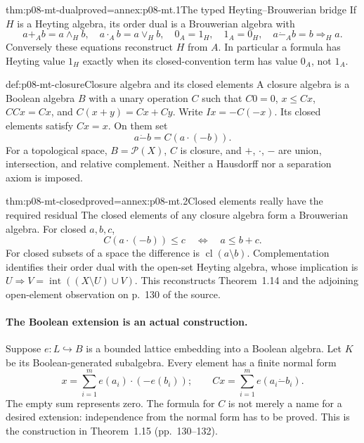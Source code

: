 \begin{hblemma}{thm:p08-mt-dual}{proved=annex:p08-mt.1}{The typed Heyting--Brouwerian bridge}
If \(H\) is a Heyting algebra, its order dual is a Brouwerian algebra with
\[
 a+_A b=a\wedge_H b,\quad a\cdot_A b=a\vee_H b,
 \quad0_A=1_H,\quad1_A=0_H,
 \quad a\mathbin{\dot{-}}_A b=b\Rightarrow_H a.
\]
Conversely these equations reconstruct \(H\) from \(A\).
In particular a formula has Heyting value \(1_H\) exactly when its
closed-convention term has value \(0_A\), not \(1_A\).
\end{hblemma}

\begin{hbdefinition}{def:p08-mt-closure}{Closure algebra and its closed elements}
A closure algebra is a Boolean algebra \(B\) with a unary operation \(C\)
such that \(C0=0\), \(x\leq Cx\), \(CCx=Cx\), and
\(C(x+y)=Cx+Cy\). Write \(Ix=-C(-x)\).
Its closed elements satisfy \(Cx=x\). On them set
\[
 a\mathbin{\dot{-}}b=C(a\cdot(-b)).
\]
For a topological space, \(B=\mathcal P(X)\), \(C\) is closure, and
\(+\), \(\cdot\), \(-\) are union, intersection, and relative complement.
Neither a Hausdorff nor a separation axiom is imposed.
\end{hbdefinition}

\begin{hblemma}{thm:p08-mt-closed}{proved=annex:p08-mt.2}{Closed elements really have the required residual}
The closed elements of any closure algebra form a Brouwerian algebra.
For closed \(a,b,c\),
\[
 C(a\cdot(-b))\leq c\quad\Longleftrightarrow\quad a\leq b+c.
\]
For closed subsets of a space the difference is
\(\operatorname{cl}(a\setminus b)\). Complementation identifies their
order dual with the open-set Heyting algebra, whose implication is
\(U\Rightarrow V=\operatorname{int}((X\setminus U)\cup V)\).
This reconstructs Theorem~1.14 and the adjoining open-element observation
on p.~130 of the source.
\end{hblemma}

\paragraph{The Boolean extension is an actual construction.}
Suppose \(e:L\hookrightarrow B\) is a bounded lattice embedding into a
Boolean algebra. Let \(K\) be its Boolean-generated subalgebra. Every
element has a finite normal form
\[
 x=\sum_{i=1}^{m} e(a_i)\cdot(-e(b_i));
 \qquad
 Cx=\sum_{i=1}^{m} e(a_i\mathbin{\dot{-}}b_i).
\]
The empty sum represents zero. The formula for \(C\) is not merely a
name for a desired extension: independence from the normal form has to
be proved. This is the construction in Theorem~1.15 (pp.~130--132).

